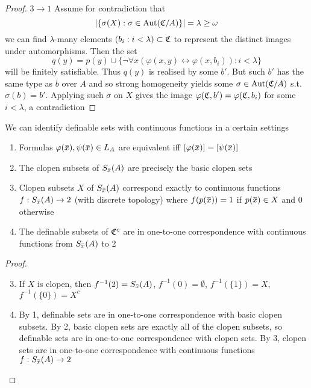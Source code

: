 \documentclass[11pt]{article}
\begin{document}
\begin{proof}
\(3\to 1\) Assume for contradiction that
\begin{equation*}
\abs{\{\sigma(X):\sigma\in\Aut(\fC/A)\}}=\lambda\ge\omega
\end{equation*}
we can find \(\lambda\)-many elements \((b_i:i<\lambda)\subset\mathfrak{C}\) to represent the distinct images under automorphisms.
Then the set
\begin{equation*}
q(y)=p(y)\cup\{\neg\forall x(\varphi(x,y)\leftrightarrow\varphi(x,b_i)):i<\lambda\}
\end{equation*}
will be finitely satisfiable. Thus \(q(y)\) is realised by some \(b'\). But such \(b'\) has the
same type as \(b\) over \(A\) and so strong homogeneity yields some \(\sigma\in\operatorname{\text{Aut}}(\mathfrak{C}/A)\)
s.t. \(\sigma(b)=b'\). Applying such \(\sigma\) on \(X\) gives the image \(\varphi(\mathfrak{C},b')=\varphi(\mathfrak{C},b_i)\) for some \(i<\lambda\),
a contradiction
\end{proof}

\begin{proposition}[]
We can identify definable sets with continuous functions in a certain settings
\begin{enumerate}
\item Formulas \(\varphi(\barx),\psi(\barx)\in L_A\) are equivalent iff \([\varphi(\barx)]=[\psi(\barx)]\)
\item The clopen subsets of \(S_{\barx}(A)\) are precisely the basic clopen sets
\setcounter{enumi}{2}
\item Clopen subsets \(X\) of \(S_{\barx}(A)\) correspond exactly to continuous
functions \(f:S_{\barx}(A)\to 2\) (with discrete topology) where \(f(p(\barx))=1\) if \(p(\barx)\in X\) and 0 otherwise
\item The definable subsets of \(\mathfrak{C}^c\) are in one-to-one correspondence with continuous functions
from \(S_{\barx}(A)\) to 2
\end{enumerate}
\end{proposition}

\begin{proof}
\begin{enumerate}
\setcounter{enumi}{2}
\item If \(X\) is clopen, then \(f^{-1}(2)=S_{\barx}(A)\), \(f^{-1}(0)=\emptyset\), \(f^{-1}(\{1\})=X\), \(f^{-1}(\{0\})=X^c\)
\item By 1, definable sets are in one-to-one correspondence with basic clopen subsets. By 2, basic
clopen sets are exactly all of the clopen subsets, so definable sets are in one-to-one
correspondence with clopen sets. By 3, clopen sets are in one-to-one correspondence with
continuous functions \(f:S_{\barx}(A)\to 2\)
\end{enumerate}
\end{proof}
\end{document}

